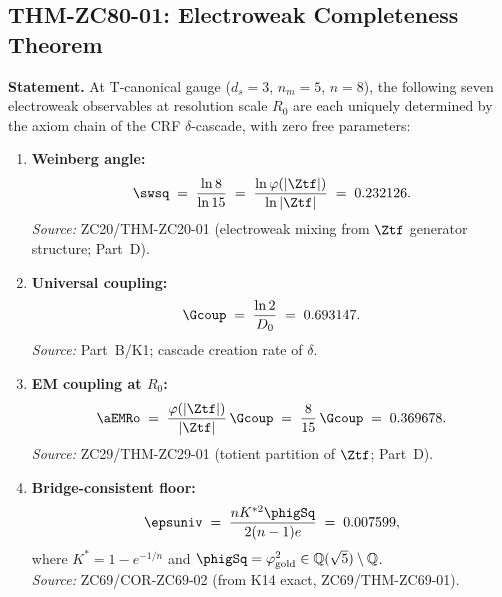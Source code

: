 \documentclass[12pt, a4paper]{article}
\begin{document}
\subsection{THM-ZC80-01: Electroweak Completeness Theorem}
\label{sec:thm}


\begin{formalbox}[title={THM-ZC80-01: Electroweak Completeness
  ($R_0$, Exact)}]

\textbf{Statement.}
At T-canonical gauge ($d_s=3$, $n_m=5$, $n=8$), the following
seven electroweak observables at resolution scale $R_0$ are
each uniquely determined by the axiom chain of the CRF
$\delta$-cascade, with zero free parameters:

\begin{enumerate}[leftmargin=2em, label=\textbf{(\arabic*)}]

\item \textbf{Weinberg angle:}
\begin{equation}
  \swsq
  \;=\; \frac{\ln 8}{\ln 15}
  \;=\; \frac{\ln\varphi(|\Ztf|)}{\ln|\Ztf|}
  \;=\; 0.232126.
  \label{eq:sin2}
\end{equation}
\textit{Source:} ZC20/THM-ZC20-01 (electroweak mixing from
$\Ztf$ generator structure; Part~D).

\item \textbf{Universal coupling:}
\begin{equation}
  \Gcoup \;=\; \frac{\ln 2}{D_0} \;=\; 0.693147.
  \label{eq:Gcoup}
\end{equation}
\textit{Source:} Part~B/K1; cascade creation rate of $\delta$.

\item \textbf{EM coupling at $R_0$:}
\begin{equation}
  \aEMRo
  \;=\; \frac{\varphi(|\Ztf|)}{|\Ztf|}\,\Gcoup
  \;=\; \frac{8}{15}\,\Gcoup
  \;=\; 0.369678.
  \label{eq:aEM}
\end{equation}
\textit{Source:} ZC29/THM-ZC29-01 (totient partition of $\Ztf$;
Part~D).

\item \textbf{Bridge-consistent floor:}
\begin{equation}
  \epsuniv
  \;=\; \frac{n K^{*2}\phigSq}{2(n-1)e}
  \;=\; 0.007599,
  \label{eq:epsuniv}
\end{equation}
where $K^* = 1-e^{-1/n}$ and $\phigSq = \varphi_{\rm gold}^2
\in\mathbb{Q}(\sqrt{5})\setminus\mathbb{Q}$.\\
\textit{Source:} ZC69/COR-ZC69-02 (from K14 exact,
ZC69/THM-ZC69-01).


\end{enumerate}
\end{formalbox}
\end{document}
